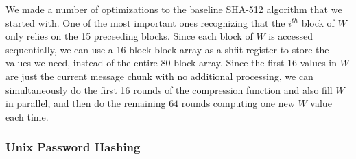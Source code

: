 We made a number of optimizations to the baseline SHA-512 algorithm that we started with. One of the
most important ones recognizing that the $i^{th}$ block of $W$ only relies on the 15 preceeding blocks.
Since each block of $W$ is accessed sequentially, we can use a 16-block block array as a shfit register
to store the values we need, instead of the entire 80 block array. Since the first 16 values in $W$ are
just the current message chunk with no additional processing, we can simultaneously do the first 16
rounds of the compression function and also fill $W$ in parallel, and then do the remaining $64$ rounds
computing one new $W$ value each time.

\subsubsection{Unix Password Hashing}

